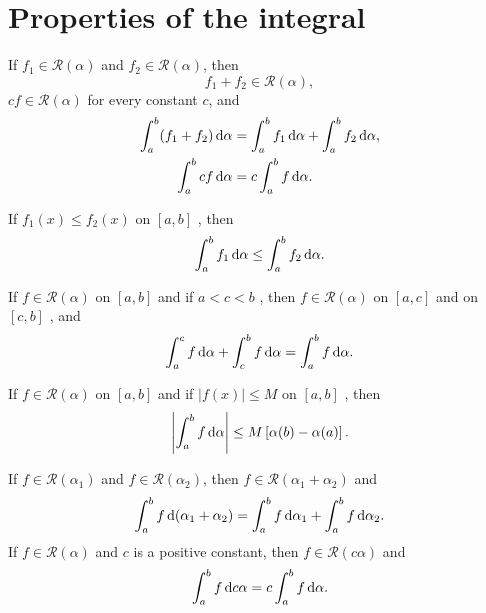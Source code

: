 \section{Properties of the integral}
\begin{thm}
    \label{thm:6.12}
    \begin{asparaenum}[(a)]
        \item If $f_1 \in \mathscr{R}(\alpha)$ and $f_2 \in \mathscr{R}(\alpha)$, then 
        \begin{equation*}
            f_1 + f_2 \in \mathscr{R}(\alpha),
        \end{equation*}
        $cf \in \mathscr{R}(\alpha)$ for every constant $c$, and 
        \begin{align*}
            \int_{a}^{b} (f_1+f_2) \d \alpha 
            &= \int_{a}^{b} f_1 \d \alpha 
            +  \int_{a}^{b} f_2 \d \alpha , \\ 
            \int_{a}^{b} cf \d \alpha 
            &= c \int_{a}^{b} f \d \alpha .
        \end{align*}
        
        \item If $f_1(x) \leq f_2(x)$ on $[a, b]$ , then
        \begin{equation*}
            \int_{a}^{b} f_1 \d \alpha \leq
            \int_{a}^{b} f_2 \d \alpha .
        \end{equation*}

        \item If $f \in \mathscr{R}(\alpha)$ on $[a, b]$ and if $a<c<b$ , 
        then $f \in \mathscr{R}(\alpha)$ on $[a, c]$ and on $[c, b]$ , and 
        \begin{equation*}
            \int_{a}^{c} f \d \alpha +
            \int_{c}^{b} f \d \alpha =
            \int_{a}^{b} f \d \alpha .
        \end{equation*}
        
        \item If $f \in \mathscr{R}(\alpha)$ on $[a, b]$ and 
        if $\left| f(x) \right| \leq M$ on $[a, b]$ , then 
        \begin{equation*}
            \left| \int_{a}^{b} f \d \alpha \right| \leq
            M\left[ \alpha(b) - \alpha(a) \right].
        \end{equation*}

        \item If $f \in \mathscr{R}(\alpha_1)$ and $f \in \mathscr{R}(\alpha_2)$, 
        then $f \in \mathscr{R}(\alpha_1 + \alpha_2)$ and 
        \begin{equation*}
            \int_{a}^{b} f \d (\alpha_1 + \alpha_2) = 
            \int_{a}^{b} f \d \alpha_1 + 
            \int_{a}^{b} f \d \alpha_2 .
        \end{equation*}
        If $f \in \mathscr{R}(\alpha)$ and $c$ is a positive constant,
        then $f \in \mathscr{R}(c\alpha)$ and 
        \begin{equation*}
            \int_{a}^{b} f \d c\alpha = 
            c\int_{a}^{b} f \d \alpha .
        \end{equation*}
    \end{asparaenum}
\end{thm}
